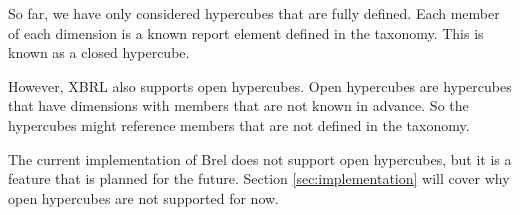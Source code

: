 So far, we have only considered hypercubes that are fully defined.
Each member of each dimension is a known report element defined in the taxonomy.
This is known as a closed hypercube.

However, XBRL also supports open hypercubes.
Open hypercubes are hypercubes that have dimensions with members that are not known in advance.
So the hypercubes might reference members that are not defined in the taxonomy.

The current implementation of Brel does not support open hypercubes, but it is a feature that is planned for the future.
Section \ref{sec:implementation} will cover why open hypercubes are not supported for now.

